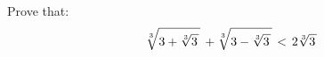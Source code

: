 Prove that:
\begin{equation*}
 \sqrt[3]{3 + \sqrt[3]{3 \mspace{2mu}} \mspace{2mu}} \, + \sqrt[3]{3 - \sqrt[3]{3 \mspace{2mu}} \mspace{2mu}} \mspace{2mu}
 < \mspace{2.5mu} 2 \sqrt[3]{3 \mspace{2mu}}
\end{equation*}
